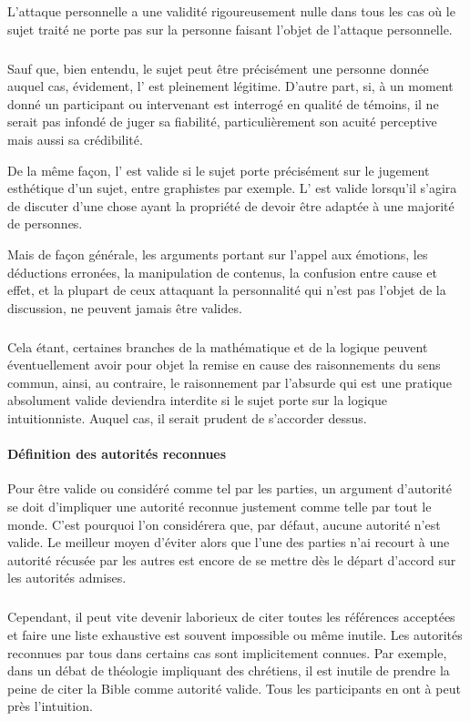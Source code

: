 L’attaque personnelle a une validité rigoureusement nulle dans tous les cas où le sujet traité ne porte pas sur la personne faisant l’objet de l’attaque personnelle.

\subparagraph{}
Sauf que, bien entendu, le sujet peut être précisément une personne donnée auquel cas, évidement, l’ est pleinement légitime. D’autre part, si, à un moment donné un participant ou intervenant est interrogé en qualité de témoins, il ne serait pas infondé de juger sa fiabilité, particulièrement son acuité perceptive mais aussi sa crédibilité.

De la même façon, l’ est valide si le sujet porte précisément sur le jugement esthétique d’un sujet, entre graphistes par exemple. L’ est valide lorsqu’il s’agira de discuter d’une chose ayant la propriété de devoir être adaptée à une majorité de personnes.

Mais de façon générale, les arguments portant sur l’appel aux émotions, les déductions erronées, la manipulation de contenus, la confusion entre cause et effet, et la plupart de ceux attaquant la personnalité qui n’est pas l’objet de la discussion, ne peuvent jamais être valides.

\subparagraph{}
Cela étant, certaines branches de la mathématique et de la logique peuvent éventuellement avoir pour objet la remise en cause des raisonnements du sens commun, ainsi, au contraire, le raisonnement par l’absurde qui est une pratique absolument valide deviendra interdite si le sujet porte sur la logique intuitionniste. Auquel cas, il serait prudent de s’accorder dessus.

\paragraph{Définition des autorités reconnues} Pour être valide ou considéré comme tel par les parties, un argument d’autorité se doit d’impliquer une autorité reconnue justement comme telle par tout le monde. C’est pourquoi l’on considérera que, par défaut, aucune autorité n’est valide. Le meilleur moyen d’éviter alors que l’une des parties n’ai recourt à une autorité récusée par les autres est encore de se mettre dès le départ d’accord sur les autorités admises.

\subparagraph{}
Cependant, il peut vite devenir laborieux de citer toutes les références acceptées et faire une liste exhaustive est souvent impossible ou même inutile. Les autorités reconnues par tous dans certains cas sont implicitement connues. Par exemple, dans un débat de théologie impliquant des chrétiens, il est inutile de prendre la peine de citer la Bible comme autorité valide. Tous les participants en ont à peut près l’intuition.

